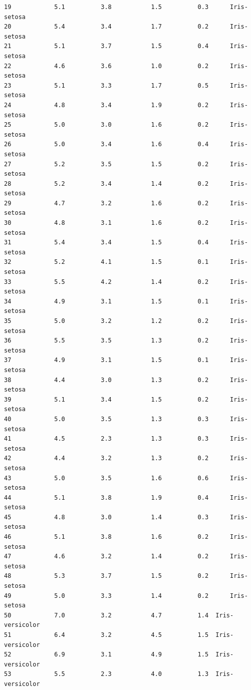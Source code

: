 \documentclass [oneside,10pt,a4paper,ngerman,BCOR10mm,headsepline,parindent,final]{scrartcl}
\begin{document}
\begin{tcolorbox}[breakable, size=fbox, boxrule=.5pt, pad at break*=1mm, opacityfill=0]
\begin{Verbatim}[commandchars=\\\{\}]
19            5.1          3.8           1.5          0.3      Iris-setosa
20            5.4          3.4           1.7          0.2      Iris-setosa
21            5.1          3.7           1.5          0.4      Iris-setosa
22            4.6          3.6           1.0          0.2      Iris-setosa
23            5.1          3.3           1.7          0.5      Iris-setosa
24            4.8          3.4           1.9          0.2      Iris-setosa
25            5.0          3.0           1.6          0.2      Iris-setosa
26            5.0          3.4           1.6          0.4      Iris-setosa
27            5.2          3.5           1.5          0.2      Iris-setosa
28            5.2          3.4           1.4          0.2      Iris-setosa
29            4.7          3.2           1.6          0.2      Iris-setosa
30            4.8          3.1           1.6          0.2      Iris-setosa
31            5.4          3.4           1.5          0.4      Iris-setosa
32            5.2          4.1           1.5          0.1      Iris-setosa
33            5.5          4.2           1.4          0.2      Iris-setosa
34            4.9          3.1           1.5          0.1      Iris-setosa
35            5.0          3.2           1.2          0.2      Iris-setosa
36            5.5          3.5           1.3          0.2      Iris-setosa
37            4.9          3.1           1.5          0.1      Iris-setosa
38            4.4          3.0           1.3          0.2      Iris-setosa
39            5.1          3.4           1.5          0.2      Iris-setosa
40            5.0          3.5           1.3          0.3      Iris-setosa
41            4.5          2.3           1.3          0.3      Iris-setosa
42            4.4          3.2           1.3          0.2      Iris-setosa
43            5.0          3.5           1.6          0.6      Iris-setosa
44            5.1          3.8           1.9          0.4      Iris-setosa
45            4.8          3.0           1.4          0.3      Iris-setosa
46            5.1          3.8           1.6          0.2      Iris-setosa
47            4.6          3.2           1.4          0.2      Iris-setosa
48            5.3          3.7           1.5          0.2      Iris-setosa
49            5.0          3.3           1.4          0.2      Iris-setosa
50            7.0          3.2           4.7          1.4  Iris-versicolor
51            6.4          3.2           4.5          1.5  Iris-versicolor
52            6.9          3.1           4.9          1.5  Iris-versicolor
53            5.5          2.3           4.0          1.3  Iris-versicolor

\end{Verbatim}
\end{tcolorbox}
\end{document}
